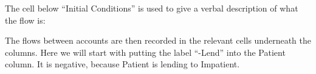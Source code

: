 \begin{center}
\end{center}

The cell below ``Initial Conditions'' is used to give a verbal
description of what the flow is: 

\begin{center}
\end{center}

The flows between accounts are then recorded in the relevant cells
underneath the columns. Here we will start with putting the label
``-Lend'' into the Patient column. It is negative, because Patient is
lending to Impatient.

\begin{center}
\end{center}

